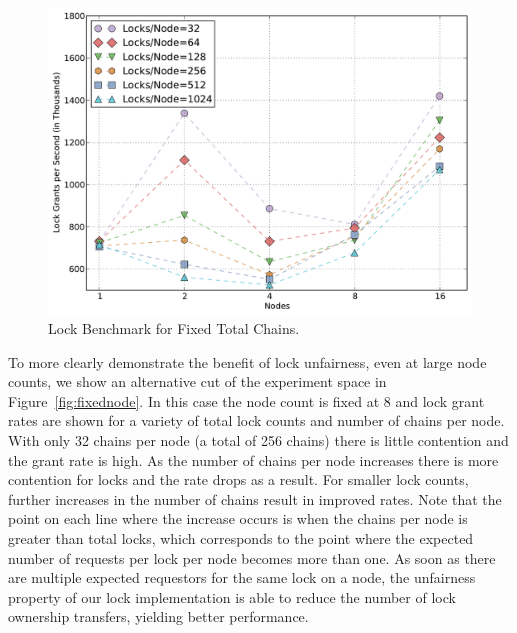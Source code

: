 
\begin{figure}
\begin{center}
\includegraphics[scale=0.33]{figs/fixed_lock_chains.pdf}
\end{center}
\vspace{-2mm}
\caption{Lock Benchmark for Fixed Total Chains.\label{fig:fixedlock}}
\vspace{-4mm}
\end{figure}

To more clearly demonstrate the benefit of lock unfairness, even at large node counts, we show an alternative
cut of the experiment space in Figure~\ref{fig:fixednode}.
In this case the node count is fixed at 8 and lock grant rates are shown for a variety of total lock counts
and number of chains per node.
With only 32 chains per node (a total of 256 chains)
there is little contention and the grant rate is high.  As the number of chains per node increases there is
more contention for locks and the rate drops as a result.  For smaller lock counts, further increases in
the number of chains result in improved rates.  Note that the point on each line where the increase occurs
is when the chains per node is greater than total locks, which corresponds to the point where the expected 
number of requests per lock 
per node becomes more than one.  As soon as there are multiple expected requestors for the same lock on
a node, the unfairness property of our lock implementation is able to reduce the number of lock ownership 
transfers, yielding better performance.

